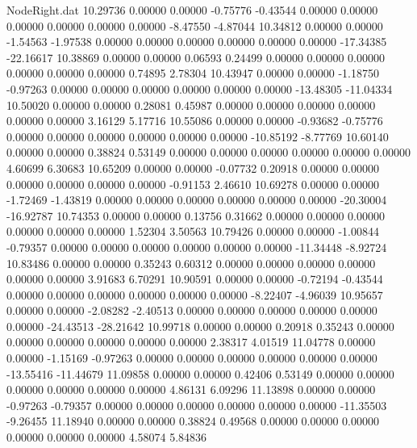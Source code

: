 \begin{filecontents}{NodeRight.dat}
  10.29736    0.00000    0.00000    -0.75776   -0.43544    0.00000    0.00000    0.00000    0.00000    0.00000    0.00000   -8.47550   -4.87044
  10.34812    0.00000    0.00000    -1.54563   -1.97538    0.00000    0.00000    0.00000    0.00000    0.00000    0.00000  -17.34385  -22.16617
  10.38869    0.00000    0.00000     0.06593    0.24499    0.00000    0.00000    0.00000    0.00000    0.00000    0.00000    0.74895    2.78304
  10.43947    0.00000    0.00000    -1.18750   -0.97263    0.00000    0.00000    0.00000    0.00000    0.00000    0.00000  -13.48305  -11.04334
  10.50020    0.00000    0.00000     0.28081    0.45987    0.00000    0.00000    0.00000    0.00000    0.00000    0.00000    3.16129    5.17716
  10.55086    0.00000    0.00000    -0.93682   -0.75776    0.00000    0.00000    0.00000    0.00000    0.00000    0.00000  -10.85192   -8.77769
  10.60140    0.00000    0.00000     0.38824    0.53149    0.00000    0.00000    0.00000    0.00000    0.00000    0.00000    4.60699    6.30683
  10.65209    0.00000    0.00000    -0.07732    0.20918    0.00000    0.00000    0.00000    0.00000    0.00000    0.00000   -0.91153    2.46610
  10.69278    0.00000    0.00000    -1.72469   -1.43819    0.00000    0.00000    0.00000    0.00000    0.00000    0.00000  -20.30004  -16.92787
  10.74353    0.00000    0.00000     0.13756    0.31662    0.00000    0.00000    0.00000    0.00000    0.00000    0.00000    1.52304    3.50563
  10.79426    0.00000    0.00000    -1.00844   -0.79357    0.00000    0.00000    0.00000    0.00000    0.00000    0.00000  -11.34448   -8.92724
  10.83486    0.00000    0.00000     0.35243    0.60312    0.00000    0.00000    0.00000    0.00000    0.00000    0.00000    3.91683    6.70291
  10.90591    0.00000    0.00000    -0.72194   -0.43544    0.00000    0.00000    0.00000    0.00000    0.00000    0.00000   -8.22407   -4.96039
  10.95657    0.00000    0.00000    -2.08282   -2.40513    0.00000    0.00000    0.00000    0.00000    0.00000    0.00000  -24.43513  -28.21642
  10.99718    0.00000    0.00000     0.20918    0.35243    0.00000    0.00000    0.00000    0.00000    0.00000    0.00000    2.38317    4.01519
  11.04778    0.00000    0.00000    -1.15169   -0.97263    0.00000    0.00000    0.00000    0.00000    0.00000    0.00000  -13.55416  -11.44679
  11.09858    0.00000    0.00000     0.42406    0.53149    0.00000    0.00000    0.00000    0.00000    0.00000    0.00000    4.86131    6.09296
  11.13898    0.00000    0.00000    -0.97263   -0.79357    0.00000    0.00000    0.00000    0.00000    0.00000    0.00000  -11.35503   -9.26455
  11.18940    0.00000    0.00000     0.38824    0.49568    0.00000    0.00000    0.00000    0.00000    0.00000    0.00000    4.58074    5.84836

\end{filecontents}
